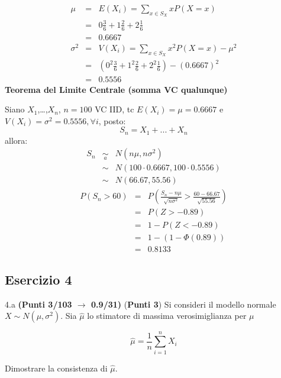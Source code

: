 \documentclass[
  11pt,
]{book}
\theoremstyle{mytheoremstyle}
\theoremstyle{mydefstyle}
\newenvironment{sol}
  {
  \begin{tcolorbox}[enhanced,breakable,arc=0.1mm,boxrule=1pt,colback=white,colframe=iblue,
  title=\bf \fontfamily{lmss}\selectfont \hspace{.5 cm} Soluzione,drop fuzzy shadow]

}{
\end{tcolorbox}
  }
\begin{document}
\begin{sol}
\begin{eqnarray*} \mu &=& E(X_i) = \sum_{x\in S_X}x P(X=x)\\ 
 &=&  0  \frac { 3 }{ 6 }+ 1  \frac { 2 }{ 6 }+ 2  \frac { 1 }{ 6 } \\ 
            &=& 0.6667 \\ 
 \sigma^2 &=& V(X_i) = \sum_{x\in S_X}x^2 P(X=x)-\mu^2\\ 
 &=&\left(  0  ^2\frac { 3 }{ 6 }+ 1  ^2\frac { 2 }{ 6 }+ 2  ^2\frac { 1 }{ 6 } \right)-( 0.6667 )^2\\ 
            &=& 0.5556 
\end{eqnarray*}
\textbf{Teorema del Limite Centrale (somma VC qualunque)}

Siano \(X_1\),\ldots,\(X_n\), \(n=100\) VC IID, tc \(E(X_i)=\mu=0.6667\) e \(V(X_i)=\sigma^2=0.5556,\forall i\), posto:
\[
      S_n = X_1 + ... + X_n
      \]
allora:\begin{eqnarray*}
  S_n & \mathop{\sim}\limits_{a}& N(n\mu,n\sigma^2) \\
     &\sim & N(100\cdot0.6667,100\cdot0.5556) \\
     &\sim & N(66.67,55.56) 
  \end{eqnarray*}\begin{eqnarray*}
      P( S_n   >   60 ) 
        &=& P\left(  \frac { S_n  -  n\mu }{ \sqrt{n\sigma^2} }  >  \frac { 60  -  66.67 }{\sqrt{ 55.56 }} \right)  \\
                 &=& P\left(  Z   >   -0.89 \right) \\    &=& 1-P(Z< -0.89 )\\ 
                 &=&  1-(1-\Phi( 0.89 )) \\ &=&  0.8133 
      \end{eqnarray*}

\end{sol}

\subsection{Esercizio 4}\label{esercizio-4-33}

4.a \textbf{(Punti 3/103 \(\rightarrow\) 0.9/31)} (\textbf{Punti 3}) Si consideri il modello normale \(X\sim N(\mu,\sigma^2)\). Sia \(\hat\mu\) lo stimatore di massima verosimiglianza per \(\mu\)

\[
  \hat\mu = \frac 1n \sum_{i=1}^n X_i
\]

Dimostrare la consistenza di \(\hat\mu\).
\end{document}
